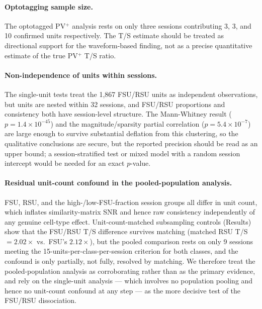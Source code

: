 \documentclass[11pt,onecolumn]{article}
\begin{document}
\paragraph{Optotagging sample size.}
The optotagged PV$^+$ analysis rests on only three sessions contributing
3, 3, and 10 confirmed units respectively.  The T/S estimate should be
treated as directional support for the waveform-based finding, not as a
precise quantitative estimate of the true PV$^+$ T/S ratio.

\paragraph{Non-independence of units within sessions.}
The single-unit tests treat the 1,867 FSU/RSU units as independent
observations, but units are nested within 32 sessions, and FSU/RSU
proportions and consistency both have session-level structure.  The
Mann-Whitney result ($p = 1.4\times10^{-45}$) and the magnitude/sparsity
partial correlation ($p = 5.4\times10^{-7}$) are large enough to survive
substantial deflation from this clustering, so the qualitative conclusions
are secure, but the reported precision should be read as an upper bound; a
session-stratified test or mixed model with a random session intercept
would be needed for an exact $p$-value.

\paragraph{Residual unit-count confound in the pooled-population analysis.}
FSU, RSU, and the high-/low-FSU-fraction session groups all differ in
unit count, which inflates similarity-matrix SNR and hence raw
consistency independently of any genuine cell-type effect.
Unit-count-matched subsampling controls (Results) show that the FSU/RSU
T/S difference survives matching (matched RSU T/S $= 2.02\times$ vs.\
FSU's $2.12\times$), but the pooled comparison rests on only 9 sessions
meeting the 15-units-per-class-per-session criterion for both classes, and
the confound is only partially, not fully, resolved by matching.  We
therefore treat the pooled-population analysis as corroborating rather
than as the primary evidence, and rely on the single-unit analysis ---
which involves no population pooling and hence no unit-count confound at
any step --- as the more decisive test of the FSU/RSU dissociation.
\end{document}
